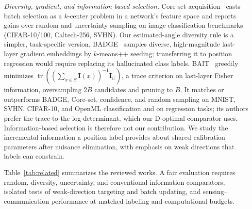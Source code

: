 \documentclass[conference]{IEEEtran}
\begin{document}
\emph{Diversity, gradient, and information-based selection.} Core-set acquisition~\cite{coreset} casts batch selection as a $k$-center problem in a network's feature space and reports gains over random and uncertainty sampling on image classification benchmarks (CIFAR-10/100, Caltech-256, SVHN). Our estimated-angle diversity rule is a simpler, task-specific version. BADGE~\cite{badge} samples diverse, high-magnitude last-layer gradient embeddings by $k$-means++ seeding; transferring it to position regression would require replacing its hallucinated class labels. BAIT~\cite{bait} greedily minimizes $\operatorname{tr}((\sum_{x\in S}\mathbf I(x))^{-1}\mathbf I_U)$, a trace criterion on last-layer Fisher information, oversampling $2B$ candidates and pruning to $B$. It matches or outperforms BADGE, Core-set, confidence, and random sampling on MNIST, SVHN, CIFAR-10, and OpenML classification and on regression tasks; its authors prefer the trace to the log-determinant, which our D-optimal comparator uses. Information-based selection is therefore not our contribution. We study the incremental information a position label provides about shared calibration parameters after nuisance elimination, with emphasis on weak directions that labels can constrain.

Table~\ref{tab:related} summarizes the reviewed works. A fair evaluation requires random, diversity, uncertainty, and conventional information comparators, isolated tests of weak-direction targeting and batch updating, and sensing--communication performance at matched labeling and computational budgets.
\end{document}
